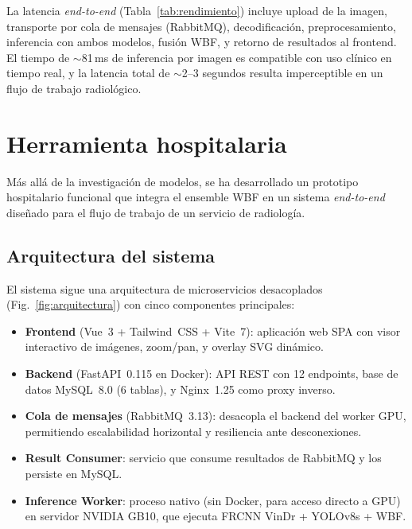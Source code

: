 \documentclass[conference]{IEEEtran}
\begin{document}
La latencia \textit{end-to-end} (Tabla~\ref{tab:rendimiento}) incluye upload
de la imagen, transporte por cola de mensajes (RabbitMQ), decodificaci\'{o}n,
preprocesamiento, inferencia con ambos modelos, fusi\'{o}n WBF, y retorno de
resultados al frontend. El tiempo de $\sim$81\,ms de inferencia por imagen es
compatible con uso cl\'{i}nico en tiempo real, y la latencia total de
$\sim$2--3 segundos resulta imperceptible en un flujo de trabajo
radiol\'{o}gico.


\section{Herramienta hospitalaria}

M\'{a}s all\'{a} de la investigaci\'{o}n de modelos, se ha desarrollado un
prototipo hospitalario funcional que integra el ensemble WBF en un sistema
\textit{end-to-end} dise\~{n}ado para el flujo de trabajo de un servicio de
radiolog\'{i}a.

\subsection{Arquitectura del sistema}

El sistema sigue una arquitectura de microservicios desacoplados
(Fig.~\ref{fig:arquitectura}) con cinco componentes principales:

\begin{itemize}
\item \textbf{Frontend} (Vue~3 + Tailwind~CSS + Vite~7): aplicaci\'{o}n web
SPA con visor interactivo de im\'{a}genes, zoom/pan, y overlay SVG
din\'{a}mico.
\item \textbf{Backend} (FastAPI~0.115 en Docker): API REST con 12 endpoints,
base de datos MySQL~8.0 (6 tablas), y Nginx~1.25 como proxy inverso.
\item \textbf{Cola de mensajes} (RabbitMQ~3.13): desacopla el backend del
worker GPU, permitiendo escalabilidad horizontal y resiliencia ante
desconexiones.
\item \textbf{Result Consumer}: servicio que consume resultados de RabbitMQ y
los persiste en MySQL.
\item \textbf{Inference Worker}: proceso nativo (sin Docker, para acceso
directo a GPU) en servidor NVIDIA GB10, que ejecuta FRCNN VinDr + YOLOv8s +
WBF.
\end{itemize}
\end{document}
